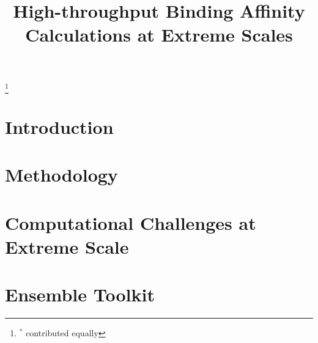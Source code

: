 \documentclass[conference]{IEEEtran}
\begin{document}
\title{High-throughput Binding Affinity Calculations at Extreme Scales}

\author{
    \IEEEauthorblockA{
    }
 }

\footnote{$^*$ contributed equally}
\maketitle



\section{Introduction}\label{sec:intro}



\section{Methodology}\label{sec:meth}





\section{Computational Challenges at Extreme Scale}\label{sec:3}



\section{Ensemble Toolkit}\label{sec:4}


\end{document}
